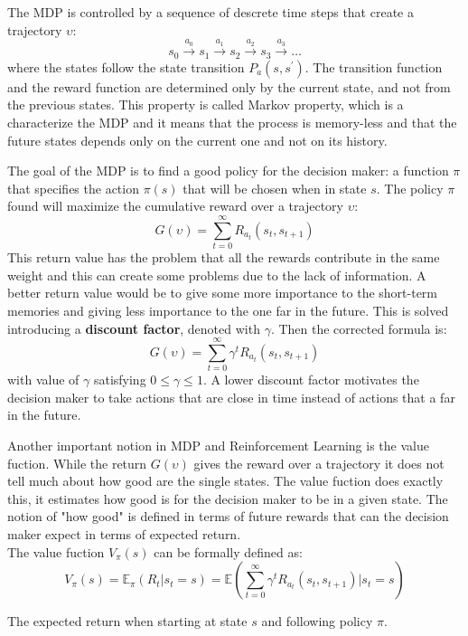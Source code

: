 \documentclass[14pt]{extarticle}
\def\ppn{\vspace{10pt}}
\begin{document}
\begin{flushleft}
\ppn
The MDP is controlled by a sequence of descrete time steps that create a trajectory $\upsilon$:
\[s_0 \xrightarrow{a_0} s_1 \xrightarrow{a_1} s_2 \xrightarrow{a_2} s_3 \xrightarrow{a_3} \dotso\]
where the states follow the state transition $P_a(s,s^\prime)$. The transition function and the reward function are determined only by the current state, and not from the previous states. This property is called Markov property, which is a characterize the MDP and it means that the process is memory-less and that the future states depends only on the current one and not on its history.

\ppn
The goal of the MDP is to find a good policy for the decision maker: a function $\pi$ that specifies the action $\pi(s)$ that will be chosen when in state $s$. The policy $\pi$ found will maximize the cumulative reward over a trajectory $\upsilon$:
\[ G(\upsilon) = \sum_{t=0}^{\infty} R_{a_t}(s_t, s_{t+1}) \] 
This return value has the problem that all the rewards contribute in the same weight and this can create some problems due to the lack of information. A better return value would be to give some more importance to the short-term memories and giving less importance to the one far in the future. This is solved introducing a \textbf{discount factor}, denoted with $\gamma$. Then the corrected formula is:
\[ G(\upsilon) = \sum_{t=0}^{\infty} \gamma^t R_{a_t}(s_t, s_{t+1}) \]
with value of $\gamma$ satisfying $ 0 \leq \gamma \leq 1$. A lower discount factor motivates the decision maker to take actions that are close in time instead of actions that a far in the future.

\ppn
Another important notion in MDP and Reinforcement Learning is the value fuction. While the return $G(\upsilon)$ gives the reward over a trajectory it does not tell much about how good are the single states. The value fuction does exactly this, it estimates how good is for the decision maker to be in a given state. The notion of "how good" is defined in terms of future rewards that can the decision maker expect in terms of expected return.
\\
The value fuction $V_{\pi}(s)$ can be formally defined as: 
\[V_{\pi}(s) = \mathbb{E}_{\pi}(R_t|s_t=s) = \mathbb{E}(\sum_{t=0}^{\infty} \gamma^t R_{a_t}(s_t, s_{t+1})|s_t=s)\]
\vspace{-9.3mm}
\begin{center}
The expected return when starting at state $s$ and following policy $\pi$.
\end{center}


\end{flushleft}
\end{document}

